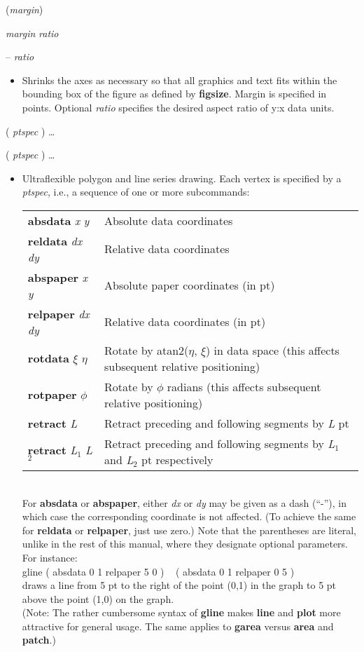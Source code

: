 \documentclass[11pt]{article}
\def\cmd#1#2{\noindent {\bf #1} #2\par}
\def\expl#1{\kern-8pt\begin{itemize}\item[]#1\end{itemize}}
\def\cref#1{{\bf #1}}
\begin{document}
\cmd{fudge}{(\emph{margin})}
\cmd{fudge}{\emph{margin} \emph{ratio}}
\cmd{fudge}{-- \emph{ratio}}
\expl{Shrinks the axes as necessary so that all graphics and text fits
  within the bounding box of the figure as defined by
  \cref{figsize}. Margin is specified in points. Optional \emph{ratio}
specifies the desired aspect ratio of y:x data units.}

\cmd{garea}{( \emph{ptspec} ) \ldots}
\cmd{gline}{( \emph{ptspec} ) \ldots}
\expl{Ultraflexible polygon and line series drawing. 
  Each vertex is specified by a \emph{ptspec}, i.e., a sequence of one or
  more subcommands:\medskip\\
\mbox{}\kern10pt\begin{tabular}{lp{3.8in}}
{\bf absdata} \emph{x} \emph{y} & Absolute data coordinates \\
{\bf reldata} \emph{dx} \emph{dy} & Relative data coordinates \\
{\bf abspaper} \emph{x} \emph{y} & Absolute paper coordinates (in pt)\\
{\bf relpaper} \emph{dx} \emph{dy} & Relative data coordinates (in
               pt)\\
{\bf rotdata} $\xi$ $\eta$ & Rotate by atan2($\eta$, $\xi$) 
              in data space (this affects subsequent relative
              positioning) \\
{\bf rotpaper} $\phi$ & Rotate by $\phi$ radians (this affects
subsequent relative positioning) \\
{\bf retract} \emph{L} & Retract preceding and following segments by
              \emph{L} pt \\
{\bf retract} \emph{L$_1$} \emph{L$_2$} & Retract preceding and following
              segments by \emph{L$_1$} and \emph{L$_2$} pt respectively \\
\end{tabular}\medskip\\
For {\bf absdata} or {\bf abspaper}, either \emph{dx} or \emph{dy} may
be given as a dash (``-''), in which case the corresponding coordinate
is not affected. (To achieve the same for {\bf reldata} or {\bf
  relpaper}, just use zero.)
Note that the parentheses are literal, unlike in the rest of this manual, where
they designate optional parameters. For instance:\medskip\\
\mbox{}\kern15pt
       gline ( absdata 0 1 relpaper 5 0 ) ~ ( absdata 0 1 relpaper 0 5 )
\medskip\\
     draws a line from 5 pt to the right of the point (0,1) in the graph to
     5 pt above the point (1,0) on the graph.\\
(Note: The rather cumbersome syntax of \cref{gline} makes \cref{line}
     and \cref{plot} more attractive for general usage. The same
     applies to \cref{garea} versus \cref{area} and \cref{patch}.)
}
\end{document}
